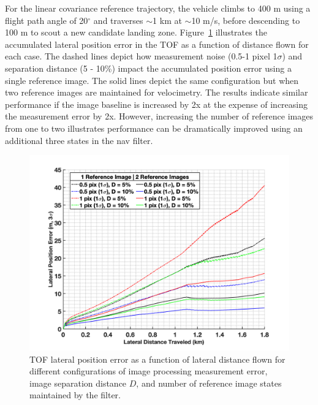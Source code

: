 For the linear covariance reference trajectory, the vehicle climbs to 400 m using a flight path angle of 20$^\circ$ and traverses $\sim$1 km at $\sim$10 m/s, before descending to 100 m to scout a new candidate landing zone. Figure~\ref{fig:velocimetry_optimization} illustrates the accumulated lateral position error in the TOF as a function of distance flown for each case. The dashed lines depict how measurement noise (0.5-1 pixel 1$\sigma$) and separation distance (5 - 10\%) impact the accumulated position error using a single reference image. The solid lines depict the same configuration but when two reference images are maintained for velocimetry. The results indicate similar performance if the image baseline is increased by 2x at the expense of increasing the measurement error by 2x. However, increasing the number of reference images from one to two illustrates performance can be dramatically improved using an additional three states in the nav filter. 

\begin{figure}[htb]
	\centering\includegraphics[width=5in]{content/figures/velocimetry_optimization.png}
	\caption{TOF lateral position error as a function of lateral distance flown for different configurations of image processing measurement error, image separation distance $D$, and number of reference image states maintained by the filter.}
	\label{fig:velocimetry_optimization}
\end{figure}


%



